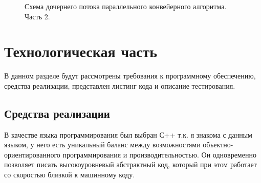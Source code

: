 \documentclass[12pt]{report}
\begin{document}
\begin{figure}[h!]
	\caption{Схема дочернего потока параллельного конвейерного алгоритма. Часть 2.}
	\label{figure:image}
\end{figure}

\chapter{Технологическая часть}
В данном разделе будут рассмотрены требования к программному обеспечению, средства реализации, представлен листинг кода и описание тестирования.

\section{Средства реализации}
В качестве языка программирования был выбран С++ т.к. я знакома с данным языком, у него есть уникальный баланс между возможностями объектно-ориентированного программирования и производительностью. Он одновременно позволяет писать высокоуровневый абстрактный код, который при этом работает со скоростью близкой к машинному коду.
\end{document}
